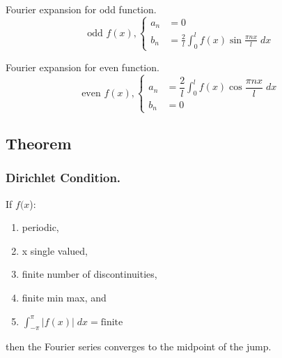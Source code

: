 \documentclass[../../../main.tex]{subfiles}
\begin{document}
Fourier expansion for odd function.
\begin{equation*}
    \text{odd }f(x),
    \begin{cases}
        a_n & =0                                                                      \\
        b_n & =\displaystyle \frac{2}{l}\int_{0}^{l}  f(x)\sin \frac{ \pi nx}{l} \;dx
    \end{cases}
\end{equation*}

Fourier expansion for even function.
\begin{equation*}
    \text{even }f(x),
    \begin{cases}
        a_n & =\dfrac{2}{l}  \displaystyle \int_{0}^{l}  f(x)\cos \dfrac{\pi nx}{l} \;dx \\
        b_n & =0
    \end{cases}
\end{equation*}

\subsection{Theorem}
\subsubsection{Dirichlet Condition.} If $f(x$):
\begin{enumerate}
    \item periodic,
    \item x single valued,
    \item finite number of discontinuities,
    \item finite min max, and
    \item $\int_{-\pi}^{\pi} |f(x)|\;dx=\text{finite}$
\end{enumerate}
then the Fourier series converges to the midpoint of the jump.
\end{document}
